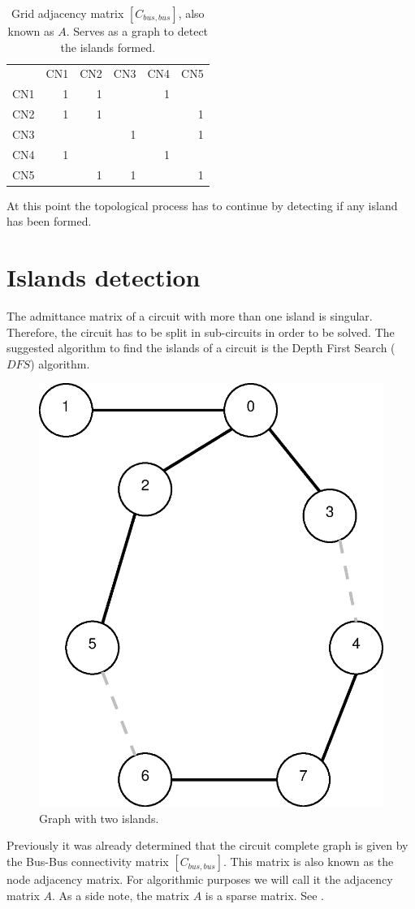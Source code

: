 \documentclass[nols,a4paper,twoside,symmetric,notoc,fleqn]{tufte-book}
\begin{document}
\begin{table}[h!]
	\begin{tabular}{lrrrrr}
		{} &  CN1 &  CN2 &  CN3 &  CN4 &  CN5 \\
		CN1 &    1 &    1 &      &    1 &      \\
		CN2 &    1 &    1 &      &      &    1 \\
		CN3 &      &      &    1 &      &    1 \\
		CN4 &    1 &      &      &    1 &      \\
		CN5 &      &    1 &    1 &      &    1 \\
	\end{tabular}
	\caption{Grid adjacency matrix $[C_{bus, bus}]$, also known as $A$. Serves as a graph to detect the islands formed.}
\end{table}

\vspace{0.5cm}

At this point the topological process has to continue by detecting if any island has been formed.

\newpage
\section{Islands detection}

The admittance matrix of a circuit with more than one island is singular. Therefore, the circuit has to be split in sub-circuits in order to be solved. The suggested algorithm to find the islands of a circuit is the Depth First Search ($DFS$) algorithm.

\begin{figure}[h!]
	\centering
	\includegraphics[width=0.35\linewidth]{img/general_graph.eps}
	\caption{Graph with two islands.}
	\label{fig:general_graph}
\end{figure}


Previously it was already determined that the circuit complete graph is given by the Bus-Bus connectivity matrix $[C_{bus, bus}]$. This matrix is also known as the node adjacency matrix. For algorithmic purposes we will call it the adjacency matrix $A$. As a side note, the matrix $A$ is a sparse matrix. See \cite{CSC_matrix}.
\end{document}
